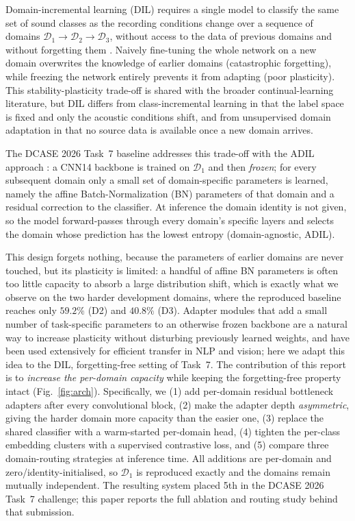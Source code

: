 \documentclass[9pt,conference]{IEEEtran}
\begin{document}
Domain-incremental learning (DIL) requires a single model to classify the
same set of sound classes as the recording conditions change over a
sequence of domains $\mathcal{D}_1 \rightarrow \mathcal{D}_2 \rightarrow
\mathcal{D}_3$, without access to the data of previous domains and without
forgetting them \cite{mulimani2025dil}. Naively fine-tuning the whole
network on a new domain overwrites the knowledge of earlier domains
(catastrophic forgetting), while freezing the network entirely prevents it
from adapting (poor plasticity). This stability-plasticity trade-off is
shared with the broader continual-learning literature, but DIL differs from
class-incremental learning in that the label space is fixed and only the
acoustic conditions shift, and from unsupervised domain adaptation in that
no source data is available once a new domain arrives.

The DCASE 2026 Task~7 baseline addresses this trade-off with the ADIL
approach \cite{mulimani2025dil}: a CNN14 \cite{kong2020panns} backbone is
trained on $\mathcal{D}_1$ and then \emph{frozen}; for every subsequent
domain only a small set of domain-specific parameters is learned, namely
the affine Batch-Normalization (BN) parameters of that domain and a
residual correction to the classifier. At inference the domain identity is
not given, so the model forward-passes through every domain's specific
layers and selects the domain whose prediction has the lowest entropy
(domain-agnostic, ADIL).

This design forgets nothing, because the parameters of earlier domains are
never touched, but its plasticity is limited: a handful of affine BN
parameters is often too little capacity to absorb a large distribution
shift, which is exactly what we observe on the two harder development
domains, where the reproduced baseline reaches only $59.2\%$ (D2) and
$40.8\%$ (D3). Adapter modules that add a small number of task-specific
parameters to an otherwise frozen backbone are a natural way to increase
plasticity without disturbing previously learned weights, and have been
used extensively for efficient transfer in NLP and vision; here we adapt
this idea to the DIL, forgetting-free setting of Task~7. The contribution
of this report is to \emph{increase the per-domain capacity} while keeping
the forgetting-free property intact (Fig.~\ref{fig:arch}). Specifically, we
(1) add per-domain residual bottleneck adapters after every convolutional
block, (2) make the adapter depth \emph{asymmetric}, giving the harder
domain more capacity than the easier one, (3) replace the shared classifier
with a warm-started per-domain head, (4) tighten the per-class embedding
clusters with a supervised contrastive loss, and (5) compare three
domain-routing strategies at inference time. All additions are per-domain
and zero/identity-initialised, so $\mathcal{D}_1$ is reproduced exactly and
the domains remain mutually independent. The resulting system placed 5th
in the DCASE 2026 Task~7 challenge; this paper reports the full ablation
and routing study behind that submission.
\end{document}
